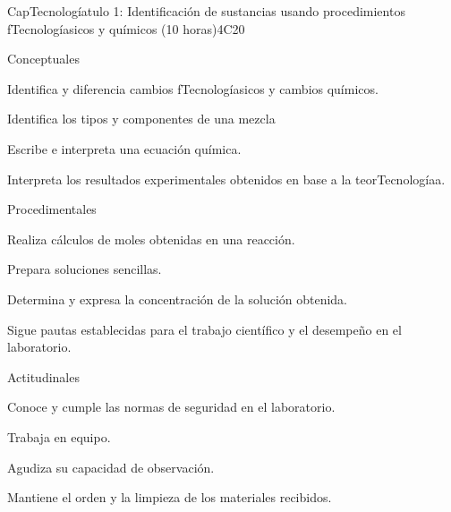 \begin{syllabus}
\begin{outcomes}
\item {}
\item {}
\end{outcomes}

\begin{competences}
    \item {}
\end{competences}

\begin{unit}{CapTecnologíatulo 1: Identificación de sustancias usando procedimientos fTecnologíasicos y químicos (10 horas)}{}{}{4}{C20}

Conceptuales

\begin{topics}
      \item Identifica y diferencia cambios fTecnologíasicos y cambios químicos.
      \item Identifica los tipos y componentes de una mezcla
      \item Escribe e interpreta una ecuación química.
      \item Interpreta los resultados experimentales obtenidos en base a la teorTecnologíaa.
   \end{topics}
   
   Procedimentales

\begin{topics}
      \item Realiza cálculos de moles obtenidas en una reacción. 
      \item Prepara soluciones sencillas.
      \item Determina y expresa la concentración de la solución obtenida.
      \item Sigue pautas establecidas para el trabajo científico y el desempeño en el laboratorio.
   \end{topics}
   
   Actitudinales

\begin{topics}
      \item Conoce y cumple las normas de seguridad en el laboratorio.
      \item Trabaja en equipo.
      \item Agudiza su capacidad de observación.
      \item Mantiene el orden y la limpieza de los materiales recibidos.
   \end{topics}


\end{unit}
\end{syllabus}
